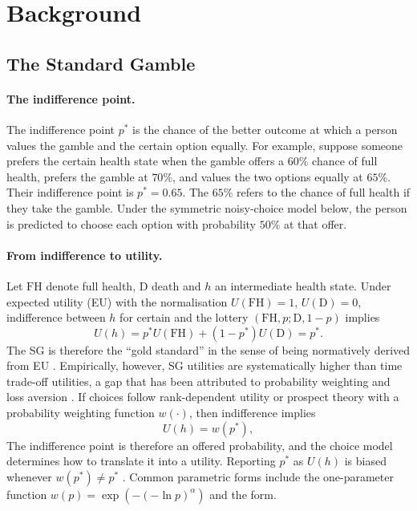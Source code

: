 \documentclass[11pt,a4paper]{article}
\begin{document}
\section{Background}
\label{sec:background}

\subsection{The Standard Gamble}

\paragraph{The indifference point.} The indifference point $p^\ast$ is the chance of the better outcome at which a person values the gamble and the certain option equally. For example, suppose someone prefers the certain health state when the gamble offers a $60\%$ chance of full health, prefers the gamble at $70\%$, and values the two options equally at $65\%$. Their indifference point is $p^\ast=0.65$. The $65\%$ refers to the chance of full health if they take the gamble. Under the symmetric noisy-choice model below, the person is predicted to choose each option with probability $50\%$ at that offer.

\paragraph{From indifference to utility.}

Let $\mathrm{FH}$ denote full health, $\mathrm{D}$ death and $h$ an intermediate health state. Under expected utility (EU) with the normalisation $U(\mathrm{FH})=1$, $U(\mathrm{D})=0$, indifference between $h$ for certain and the lottery $(\mathrm{FH},p;\mathrm{D},1-p)$ implies
\begin{equation}
  U(h) = p^\ast U(\mathrm{FH}) + (1-p^\ast)U(\mathrm{D}) = p^\ast.
  \label{eq:sg-eu}
\end{equation}
The SG is therefore the ``gold standard'' in the sense of being normatively derived from EU \citep{torrance1986}. Empirically, however, SG utilities are systematically higher than time trade-off utilities, a gap that has been attributed to probability weighting and loss aversion \citep{bleichrodt2002}. If choices follow rank-dependent utility or prospect theory with a probability weighting function $w(\cdot)$, then indifference implies
\begin{equation}
  U(h) = w(p^\ast),
  \label{eq:sg-rdu}
\end{equation}
The indifference point is therefore an offered probability, and the choice model determines how to translate it into a utility. Reporting $p^\ast$ as $U(h)$ is biased whenever $w(p^\ast)\neq p^\ast$ \citep{bleichrodt2001}. Common parametric forms include the one-parameter \citet{prelec1998} function $w(p)=\exp(-(-\ln p)^{\alpha})$ and the \citet{tversky1992} form.
\end{document}
